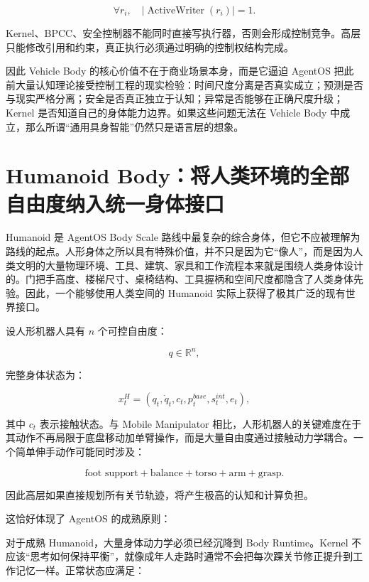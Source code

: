 $$
\forall r_i,
\quad
|\operatorname{ActiveWriter}(r_i)|=1.
$$

Kernel、BPCC、安全控制器不能同时直接写执行器，否则会形成控制竞争。高层只能修改引用和约束，真正执行必须通过明确的控制权结构完成。

因此 Vehicle Body 的核心价值不在于商业场景本身，而是它逼迫 AgentOS 把此前大量认知理论接受控制工程的现实检验：时间尺度分离是否真实成立；预测是否与现实严格分离；安全是否真正独立于认知；异常是否能够在正确尺度升级；Kernel 是否知道自己的身体能力边界。如果这些问题无法在 Vehicle Body 中成立，那么所谓“通用具身智能”仍然只是语言层的想象。

\section{Humanoid Body：将人类环境的全部自由度纳入统一身体接口}

Humanoid 是 AgentOS Body Scale 路线中最复杂的综合身体，但它不应被理解为路线的起点。人形身体之所以具有特殊价值，并不只是因为它“像人”，而是因为人类文明的大量物理环境、工具、建筑、家具和工作流程本来就是围绕人类身体设计的。门把手高度、楼梯尺寸、桌椅结构、工具握柄和空间尺度都隐含了人类身体先验。因此，一个能够使用人类空间的 Humanoid 实际上获得了极其广泛的现有世界接口。

设人形机器人具有 $n$ 个可控自由度：

$$
q\in\mathbb R^n,
$$

完整身体状态为：

$$
x_t^H=
(q_t,\dot q_t,
c_t,
p_t^{base},
s_t^{int},
e_t),
$$

其中 $c_t$ 表示接触状态。与 Mobile Manipulator 相比，人形机器人的关键难度在于其动作不再局限于底盘移动加单臂操作，而是大量自由度通过接触动力学耦合。一个简单伸手动作可能同时涉及：

$$
\text{foot support}
+
\text{balance}
+
\text{torso}
+
\text{arm}
+
\text{grasp}.
$$

因此高层如果直接规划所有关节轨迹，将产生极高的认知和计算负担。

这恰好体现了 AgentOS 的成熟原则：

\begin{statementbox}
\centering
{}
\end{statementbox}

对于成熟 Humanoid，大量身体动力学必须已经沉降到 Body Runtime。Kernel 不应该“思考如何保持平衡”，就像成年人走路时通常不会把每次踝关节修正提升到工作记忆一样。正常状态应满足：

